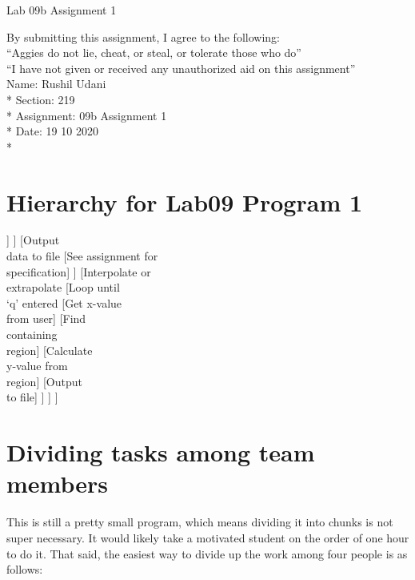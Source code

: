 \documentclass{article}
\begin{document}
{\Large Lab 09b Assignment 1}
\vspace{0.25in}

\noindent
By submitting this assignment, I agree to the following: \\
\indent ``Aggies do not lie, cheat, or steal, or tolerate those who do'' \\
\indent ``I have not given or received any unauthorized aid on this assignment'' \\

\noindent
Name:        Rushil Udani \\*
Section:     219 \\*
Assignment:  09b Assignment 1 \\*
Date:        19 10 2020 \\*

\hrulefill

\section{Hierarchy for Lab09 Program 1}

\begin{forest}
	[Program, for tree={fill=green!20, draw=black, align=center}, for leaves={fill=blue!20}, for children={fit=rectangle}
		[Get user input
			[Get name of\\dependent\\variable]
			[Loop until\\`q' entered
				[Get x and\\y values]
			]
		]
		[Output\\data to file
			[See assignment for\\specification]
		]
		[Interpolate or\\extrapolate
			[Loop until\\`q' entered
				[Get x-value\\from user]
				[Find\\containing\\region]
				[Calculate\\y-value from\\region]
				[Output\\to file]
			]
		]
	]
\end{forest}


\section{Dividing tasks among team members}

This is still a pretty small program, which means dividing it into chunks is 
not super necessary. It would likely take a motivated student on the order of 
one hour to do it. That said, the easiest way to divide up the work among four 
people is as follows:
\end{document}
